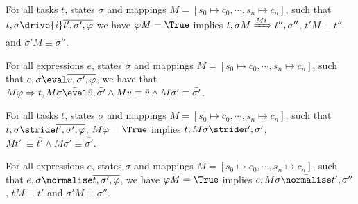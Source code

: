 %

\begin{theorem}
  \label{thm:sounddrive}

  For all tasks $t$, states $\sigma$ and mappings $M=[s_0\mapsto c_0,\cdots,s_n\mapsto c_n]$,
  such that $t,\sigma\drive{i} \overline{t',\sigma',\phi}$
  we have $\phi M = \True$ implies
  $t,\sigma M \xRightarrow[]{M i} t'',\sigma''$, $t'M \equiv t''$ and $\sigma' M \equiv \sigma''$.
\end{theorem}

\begin{lemma}
  \label{lem:soundeval}

  For all expressions $e$, states $\sigma$ and mappings $M=[s_0\mapsto c_0,\cdots,s_n\mapsto c_n]$,
  such that $e,\sigma\eval \overline{v,\sigma',\phi}$,
  we have that $M\phi \implies t,M\sigma \bar{\eval}\bar{v},\bar{\sigma'} \land Mv \equiv \bar{v} \wedge M\sigma' \equiv \bar{\sigma'}$.

\end{lemma}

\begin{lemma}
  \label{lem:soundstride}

  For all tasks $t$, states $\sigma$ and mappings $M=[s_0\mapsto c_0,\cdots,s_n\mapsto c_n]$,
  such that $t,\sigma\stride \overline{t',\sigma',\phi}$,
  $M \phi= \True$ implies
  $t,M\sigma \bar{\stride}\bar{t'},\bar{\sigma'}$, $M t'\ \equiv \bar{t'} \land M\sigma' \equiv \bar{\sigma'}$.

\end{lemma}

\begin{lemma}
  \label{lem:soundnorm}

  For all expressions $e$, states $\sigma$ and mappings $M=[s_0\mapsto c_0,\cdots,s_n\mapsto c_n]$,
  such that $e,\sigma\normalise \overline{t,\sigma',\phi}$,
  we have $\phi M =\True$ implies
  $e,M \sigma \bar{\normalise}t',\sigma''$, $t M \equiv t'$ and $\sigma' M \equiv \sigma''$.

\end{lemma}

